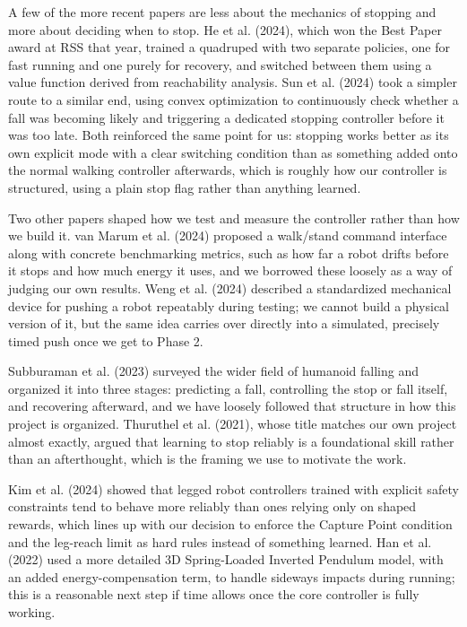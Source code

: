 \documentclass{llncs}
\begin{document}
A few of the more recent papers are less about the mechanics of stopping and more about deciding
when to stop. He et al. (2024), which won the Best Paper award at RSS that year, trained a
quadruped with two separate policies, one for fast running and one purely for recovery, and
switched between them using a value function derived from reachability analysis. Sun et al.
(2024) took a simpler route to a similar end, using convex optimization to continuously check
whether a fall was becoming likely and triggering a dedicated stopping controller before it was
too late. Both reinforced the same point for us: stopping works better as its own explicit mode
with a clear switching condition than as something added onto the normal walking controller
afterwards, which is roughly how our controller is structured, using a plain stop flag rather
than anything learned.

Two other papers shaped how we test and measure the controller rather than how we build it. van
Marum et al. (2024) proposed a walk/stand command interface along with concrete benchmarking
metrics, such as how far a robot drifts before it stops and how much energy it uses, and we
borrowed these loosely as a way of judging our own results. Weng et al. (2024) described a
standardized mechanical device for pushing a robot repeatably during testing; we cannot build a
physical version of it, but the same idea carries over directly into a simulated, precisely
timed push once we get to Phase 2.

Subburaman et al. (2023) surveyed the wider field of humanoid falling and organized it into three
stages: predicting a fall, controlling the stop or fall itself, and recovering afterward, and we
have loosely followed that structure in how this project is organized. Thuruthel et al. (2021),
whose title matches our own project almost exactly, argued that learning to stop reliably is a
foundational skill rather than an afterthought, which is the framing we use to motivate the work.

Kim et al. (2024) showed that legged robot controllers trained with explicit safety constraints
tend to behave more reliably than ones relying only on shaped rewards, which lines up with our
decision to enforce the Capture Point condition and the leg-reach limit as hard rules instead of
something learned. Han et al. (2022) used a more detailed 3D Spring-Loaded Inverted Pendulum
model, with an added energy-compensation term, to handle sideways impacts during running; this is
a reasonable next step if time allows once the core controller is fully working.
\end{document}
